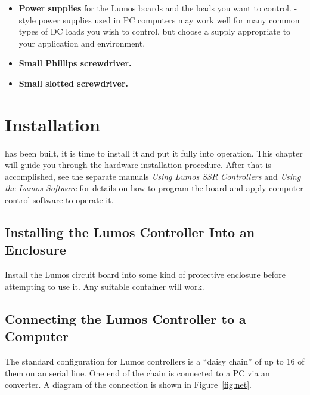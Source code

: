 \documentclass[letterpaper,twoside,onecolumn,openright,final]{memoir}
\begin{document}
\begin{itemize}
	\item	{\bfseries Power supplies} for the Lumos boards and the loads you want to control.  -style power
		supplies used in PC computers may work well for many common types of DC loads you wish to control, but choose
		a supply appropriate to your application and environment.

	\item	{\bfseries Small Phillips screwdriver.}

	\item	{\bfseries Small slotted screwdriver.}
\end{itemize}

\chapter{Installation}\label{ch:installation}
 has been built, it is time to install it and
put it fully into operation.  This chapter will guide you through the hardware installation
procedure.
After that is accomplished, see the separate manuals \emph{Using Lumos SSR Controllers} 
and \emph{Using the Lumos Software} for 
details on how to program the board and apply computer control software to operate it.

\section{Installing the Lumos Controller Into an Enclosure}
Install the Lumos circuit board into some kind of protective
enclosure before attempting to use it.  Any suitable container will work.

\section{Connecting the Lumos Controller to a Computer}
The standard configuration for Lumos controllers is a ``daisy chain'' of up to 16 of them on an 
serial line.  One end of the chain is connected to a PC via an  converter. 
A diagram of the  connection is shown in Figure~\ref{fig:net}.  
\end{document}
